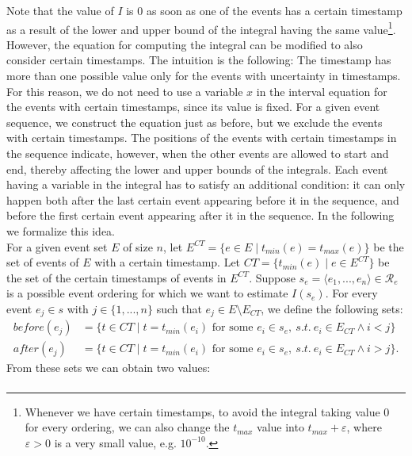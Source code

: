 \begin{itemize}
%
%
%
Note that the value of $I$ is 0 as soon as one of the events has a certain timestamp as a result of the lower and upper bound of the integral having the same value\footnote{Whenever we have certain timestamps, to avoid the integral taking value 0 for every ordering, we can also change the $t_{max}$ value into $t_{max}+\varepsilon$, where $\varepsilon > 0$ is a very small value, e.g. $10^{-10}$.}.
However, the equation for computing the integral can be modified to also consider certain timestamps. 
The intuition is the following: The timestamp has more than one possible value only for the events with uncertainty in timestamps.
For this reason, we do not need to use a variable $x$ in the interval equation for the events with certain timestamps, since its value is fixed.
For a given event sequence, we construct the equation just as before, but we exclude the events with certain timestamps.
The positions of the events with certain timestamps in the sequence indicate, however, when the other events are allowed to start and end, thereby affecting the lower and upper bounds of the integrals.
Each event having a variable in the integral has to satisfy an additional condition:
it can only happen both after the last certain event appearing before it in the sequence, and before the first certain event appearing after it in the sequence.
In the following we formalize this idea.\\
For a given event set $E$ of size $n$, let 
$E^{CT} = \{e \in E \mid t_{min}(e) = t_{max}(e)\}$
be the set of events of $E$ with a certain timestamp.
Let $CT = \{t_{min}(e) \mid e \in E^{CT}\}$ be the set of the certain timestamps of events in $E^{CT}$.
Suppose $s_e=\langle e_1,...,e_n \rangle \in \mathcal{R}_e$ is a possible event ordering for which we want to estimate $I(s_e)$.
For every event $e_j \in s$ with $j \in \{1,...,n\}$ such that $e_j \in E \setminus E_{CT}$, we define the following sets:
\begin{align*}
before(e_j) &= \{t \in CT \mid t=t_{min}(e_i) \text{ for some } e_i \in s_e, ~ s.t. ~ e_i \in E_{CT} \wedge i<j\} \\
after(e_j) &= \{t \in CT \mid t=t_{min}(e_i) \text{ for some } e_i \in s_e, ~ s.t. ~ e_i \in E_{CT} \wedge i>j\}.
\end{align*}
From these sets we can obtain two values: 
\begin{align*}

\end{align*}
\end{itemize}
